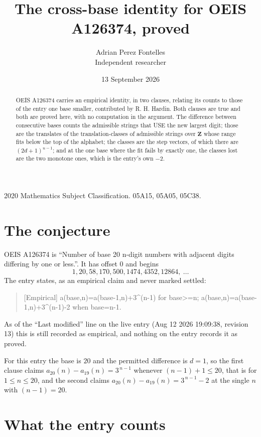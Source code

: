 \documentclass[11pt,a4paper]{article}
\title{The cross-base identity for OEIS A126374, proved}
\author{Adrian Perez Fontelles\\ \small Independent researcher}
\date{13 September 2026}
\theoremstyle{plain}
\theoremstyle{definition}
\begin{document}
\maketitle

\begin{abstract}
OEIS A126374 carries an empirical identity, in two clauses, relating its counts to those of the
entry one base smaller, contributed by R. H. Hardin. Both clauses are true and both are proved
here, with no computation in the argument. The difference between consecutive bases counts the
admissible strings that USE the new largest digit; those are the translates of the
translation-classes of admissible strings over $\mathbf{Z}$ whose range fits below the top of
the alphabet; the classes are the step vectors, of which there are $(2d+1)^{n-1}$; and at the
one base where the fit fails by exactly one, the classes lost are the two monotone ones, which
is the entry's own $-2$.
\end{abstract}

\noindent\small 2020 Mathematics Subject Classification. 05A15, 05A05, 05C38.\normalsize

\section{The conjecture}

OEIS A126374 is ``Number of base 20 n-digit numbers with adjacent digits differing by one or less.''. It has offset $0$ and begins
\[
1, 20, 58, 170, 500, 1474, 4352, 12864,\ \dots
\]
The entry states, as an empirical claim and never marked settled:
\begin{quote}
[Empirical] a(base,n)=a(base-1,n)+3\textasciicircum{}(n-1) for base>=n; a(base,n)=a(base-1,n)+3\textasciicircum{}(n-1)-2 when base=n-1.
\end{quote}
As of the ``Last modified'' line on the live entry (Aug 12 2026 19:09:38, revision 13)
this is still recorded as empirical, and nothing on the entry records it as proved.

For this entry the base is $20$ and the permitted difference is $d=1$, so the first clause
claims $a_{20}(n)-a_{19}(n)=3^{\,n-1}$ whenever $(n-1)+1\le20$, that is for
$1\le n\le20$, and the second claims $a_{20}(n)-a_{19}(n)=3^{\,n-1}-2$ at the single
$n$ with $(n-1)=20$.

\section{What the entry counts}
\end{document}
